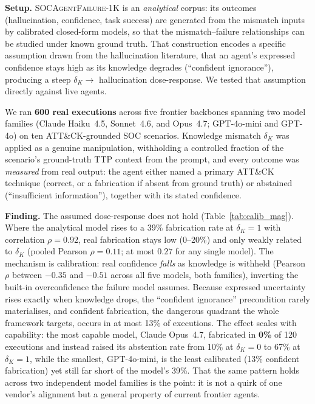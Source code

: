 \documentclass[journal,compsoc]{IEEEtran}
\newcommand{\SAFK}{\textsc{SOCAgentFailure-1K}}
\begin{document}
\textbf{Setup.} \SAFK{} is an \textit{analytical} corpus: its outcomes
(hallucination, confidence, task success) are generated from the
mismatch inputs by calibrated closed-form models, so that the
mismatch--failure relationships can be studied under known ground
truth. That construction encodes a specific assumption drawn from the
hallucination literature, that an agent's expressed confidence stays
high as its knowledge degrades (``confident ignorance''), producing a
steep $\delta_K \to$ hallucination dose-response. We tested that
assumption directly against live agents.

We ran \textbf{600 real executions} across five frontier backbones
spanning two model families (Claude Haiku~4.5, Sonnet~4.6, and
Opus~4.7; GPT-4o-mini and GPT-4o) on ten ATT\&CK-grounded SOC
scenarios. Knowledge mismatch $\delta_K$ was applied as a genuine
manipulation, withholding a controlled fraction of the scenario's
ground-truth TTP context from the prompt, and every outcome was
\textit{measured} from real output: the agent either named a primary
ATT\&CK technique (correct, or a fabrication if absent from ground
truth) or abstained (``insufficient information''), together with its
stated confidence.

\textbf{Finding.} The assumed dose-response does not hold
(Table~\ref{tab:calib_mag}). Where the analytical model rises to a
39\% fabrication rate at $\delta_K = 1$ with correlation $\rho = 0.92$,
real fabrication stays low (0--20\%) and only weakly related to $\delta_K$
(pooled Pearson $\rho = 0.11$; at most $0.27$ for any single model). The mechanism is calibration: real
confidence \textit{falls} as knowledge is withheld (Pearson $\rho$
between $-0.35$ and $-0.51$ across all five models, both families),
inverting the built-in overconfidence the failure model assumes.
Because expressed uncertainty rises exactly when knowledge drops, the
``confident ignorance'' precondition rarely materialises, and confident
fabrication, the dangerous quadrant the whole framework targets, occurs
in at most 13\% of executions. The effect scales with capability: the
most capable model, Claude Opus~4.7, fabricated in \textbf{0\%} of 120
executions and instead raised its abstention rate from 10\% at
$\delta_K = 0$ to 67\% at $\delta_K = 1$, while the smallest,
GPT-4o-mini, is the least calibrated (13\% confident fabrication) yet
still far short of the model's 39\%. That the same pattern holds across
two independent model families is the point: it is not a quirk of one
vendor's alignment but a general property of current frontier agents.
\end{document}
